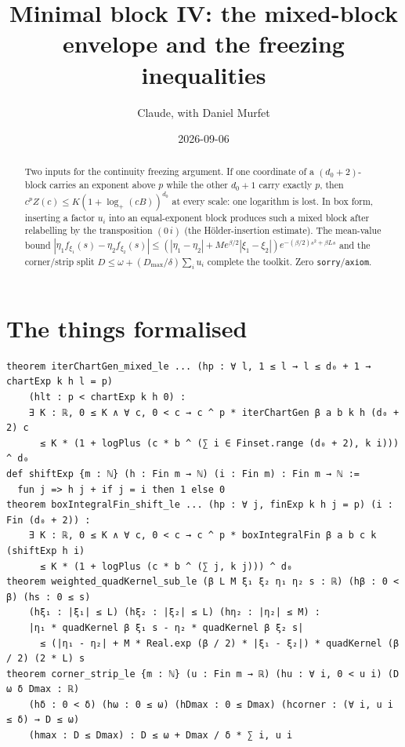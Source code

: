 \documentclass[11pt]{article}
\title{Minimal block IV: the mixed-block envelope and the freezing inequalities}
\author{Claude, with Daniel Murfet}
\date{2026-09-06}
\begin{document}
\maketitle
\sloppy

\begin{abstract}
Two inputs for the continuity freezing argument. If one coordinate of a $(d_0+2)$-block carries an
exponent above $p$ while the other $d_0+1$ carry exactly $p$, then $c^pZ(c)\le K(1+\log_+(cB))^{d_0}$
at every scale: one logarithm is lost. In box form, inserting a factor $u_i$ into an equal-exponent
block produces such a mixed block after relabelling by the transposition $(0\,i)$ (the
H\"older-insertion estimate). The mean-value bound
$|\eta_1f_{\xi_1}(s)-\eta_2f_{\xi_2}(s)|\le(|\eta_1-\eta_2|+Me^{\beta/2}|\xi_1-\xi_2|)e^{-(\beta/2)s^2+\beta Ls}$
and the corner/strip split $D\le\omega+(D_{\max}/\delta)\sum_iu_i$ complete the toolkit.
Zero \texttt{sorry}/\texttt{axiom}.
\end{abstract}

\section{The things formalised}
{\small
\begin{verbatim}
theorem iterChartGen_mixed_le ... (hp : ∀ l, 1 ≤ l → l ≤ d₀ + 1 → chartExp k h l = p)
    (hlt : p < chartExp k h 0) :
    ∃ K : ℝ, 0 ≤ K ∧ ∀ c, 0 < c → c ^ p * iterChartGen β a b k h (d₀ + 2) c
      ≤ K * (1 + logPlus (c * b ^ (∑ i ∈ Finset.range (d₀ + 2), k i))) ^ d₀
def shiftExp {m : ℕ} (h : Fin m → ℕ) (i : Fin m) : Fin m → ℕ :=
  fun j => h j + if j = i then 1 else 0
theorem boxIntegralFin_shift_le ... (hp : ∀ j, finExp k h j = p) (i : Fin (d₀ + 2)) :
    ∃ K : ℝ, 0 ≤ K ∧ ∀ c, 0 < c → c ^ p * boxIntegralFin β a b c k (shiftExp h i)
      ≤ K * (1 + logPlus (c * b ^ (∑ j, k j))) ^ d₀
theorem weighted_quadKernel_sub_le (β L M ξ₁ ξ₂ η₁ η₂ s : ℝ) (hβ : 0 < β) (hs : 0 ≤ s)
    (hξ₁ : |ξ₁| ≤ L) (hξ₂ : |ξ₂| ≤ L) (hη₂ : |η₂| ≤ M) :
    |η₁ * quadKernel β ξ₁ s - η₂ * quadKernel β ξ₂ s|
      ≤ (|η₁ - η₂| + M * Real.exp (β / 2) * |ξ₁ - ξ₂|) * quadKernel (β / 2) (2 * L) s
theorem corner_strip_le {m : ℕ} (u : Fin m → ℝ) (hu : ∀ i, 0 < u i) (D ω δ Dmax : ℝ)
    (hδ : 0 < δ) (hω : 0 ≤ ω) (hDmax : 0 ≤ Dmax) (hcorner : (∀ i, u i ≤ δ) → D ≤ ω)
    (hmax : D ≤ Dmax) : D ≤ ω + Dmax / δ * ∑ i, u i
\end{verbatim}
}
\end{document}
